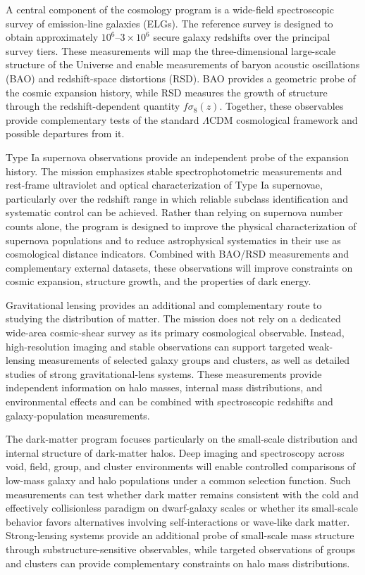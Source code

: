 A central component of the cosmology program is a wide-field spectroscopic survey of emission-line galaxies (ELGs). The reference survey is designed to obtain approximately \(10^{6}\)--\(3\times10^{6}\) secure galaxy redshifts over the principal survey tiers. These measurements will map the three-dimensional large-scale structure of the Universe and enable measurements of baryon acoustic oscillations (BAO) and redshift-space distortions (RSD). BAO provides a geometric probe of the cosmic expansion history, while RSD measures the growth of structure through the redshift-dependent quantity \(f\sigma_{8}(z)\). Together, these observables provide complementary tests of the standard \(\Lambda\)CDM cosmological framework and possible departures from it.

Type Ia supernova observations provide an independent probe of the expansion history. The mission emphasizes stable spectrophotometric measurements and rest-frame ultraviolet and optical characterization of Type Ia supernovae, particularly over the redshift range in which reliable subclass identification and systematic control can be achieved. Rather than relying on supernova number counts alone, the program is designed to improve the physical characterization of supernova populations and to reduce astrophysical systematics in their use as cosmological distance indicators. Combined with BAO/RSD measurements and complementary external datasets, these observations will improve constraints on cosmic expansion, structure growth, and the properties of dark energy.

Gravitational lensing provides an additional and complementary route to studying the distribution of matter. The mission does not rely on a dedicated wide-area cosmic-shear survey as its primary cosmological observable. Instead, high-resolution imaging and stable observations can support targeted weak-lensing measurements of selected galaxy groups and clusters, as well as detailed studies of strong gravitational-lens systems. These measurements provide independent information on halo masses, internal mass distributions, and environmental effects and can be combined with spectroscopic redshifts and galaxy-population measurements.

The dark-matter program focuses particularly on the small-scale distribution and internal structure of dark-matter halos. Deep imaging and spectroscopy across void, field, group, and cluster environments will enable controlled comparisons of low-mass galaxy and halo populations under a common selection function. Such measurements can test whether dark matter remains consistent with the cold and effectively collisionless paradigm on dwarf-galaxy scales or whether its small-scale behavior favors alternatives involving self-interactions or wave-like dark matter. Strong-lensing systems provide an additional probe of small-scale mass structure through substructure-sensitive observables, while targeted observations of groups and clusters can provide complementary constraints on halo mass distributions.

